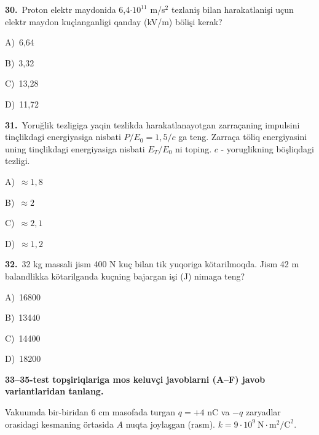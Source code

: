 \documentclass[11pt,a4paper]{article}
\newcommand{\opt}[2]{\hspace*{4mm}#1)\ #2\par}
\begin{document}
\noindent\begin{minipage}{\linewidth}
\textbf{30.}\ Proton elektr maydonida 6,4$\cdot10^{11}$ m/s$^{2}$ tezlaniş bilan harakatlanişi uçun elektr maydon kuçlanganligi qanday (kV/m) bölişi kerak?\par\smallskip
\opt{A}{6,64}
\opt{B}{3,32}
\opt{C}{13,28}
\opt{D}{11,72}
\end{minipage}\vspace{9pt}\par
\noindent\begin{minipage}{\linewidth}
\textbf{31.}\ Yoruğlik tezligiga yaqin tezlikda harakatlanayotgan zarraçaning impulsini tinçlikdagi energiyasiga nisbati $P/E_0=1{,}5/c$ ga teng. Zarraça töliq energiyasini uning tinçlikdagi energiyasiga nisbati $E_T/E_0$ ni toping. $c$ - yoruglikning böşliqdagi tezligi.\par\smallskip
\opt{A}{$\approx1{,}8$}
\opt{B}{$\approx2$}
\opt{C}{$\approx2{,}1$}
\opt{D}{$\approx1{,}2$}
\end{minipage}\vspace{9pt}\par
\noindent\begin{minipage}{\linewidth}
\textbf{32.}\ 32 kg massali jism 400 N kuç bilan tik yuqoriga kötarilmoqda. Jism 42 m balandlikka kötarilganda kuçning bajargan işi (J) nimaga teng?\par\smallskip
\opt{A}{16800}
\opt{B}{13440}
\opt{C}{14400}
\opt{D}{18200}
\end{minipage}\vspace{9pt}\par
\newpage\noindent\textbf{33–35-test topşiriqlariga mos keluvçi javoblarni (A–F) javob variantlaridan tanlang.}\par\smallskip
Vakuumda bir-biridan 6 cm masofada turgan $q=+4$ nC va $-q$ zaryadlar orasidagi kesmaning örtasida $A$ nuqta joylaşgan (rasm). $k=9\cdot10^9\ \mathrm{N\cdot m^2/C^2}$.\par\medskip
\begin{center}\end{center}
\end{document}
